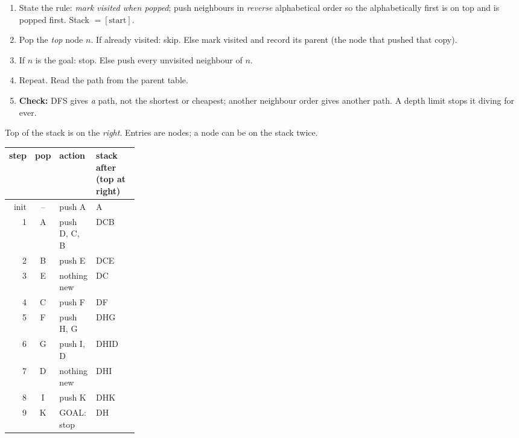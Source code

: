 \begin{multicols}{2}
\begin{recipe}
\begin{enumerate}
\item State the rule: \emph{mark visited when popped}; push neighbours in \emph{reverse} alphabetical order so the alphabetically first is on top and is popped first. Stack $=[\text{start}]$.
\item Pop the \emph{top} node $n$. If already visited: skip. Else mark visited and record its parent (the node that pushed that copy).
\item If $n$ is the goal: stop. Else push every unvisited neighbour of $n$.
\item Repeat. Read the path from the parent table.
\item \textbf{Check:} DFS gives \emph{a} path, not the shortest or cheapest; another neighbour order gives another path. A depth limit  stops it diving for ever.
\end{enumerate}
\end{recipe}
\begin{worked}
Top of the stack is on the \emph{right}. Entries are nodes; a node can be on the stack twice.\par\vspace{2pt}
\scriptsize\setlength{\tabcolsep}{3pt}
\begin{tabularx}{\linewidth}{@{}rc>{\raggedright\arraybackslash}p{0.25\linewidth}X@{}}\toprule
step & pop & action & stack after (top at right)\\\midrule
init & -- & push A & A\\
1 & A & push D, C, B & DCB\\
2 & B & push E & DCE\\
3 & E & nothing new & DC\\
4 & C & push F & DF\\
5 & F & push H, G & DHG\\
6 & G & push I, D & DHID\\
7 & D & nothing new & DHI\\
8 & I & push K & DHK\\
9 & K & GOAL: stop & DH\\
\bottomrule\end{tabularx}\par\vspace{2pt}\small

\end{worked}
\end{multicols}
